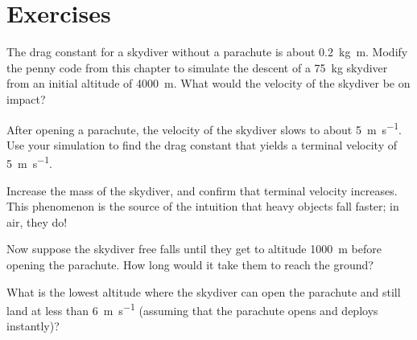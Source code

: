 \section{Exercises}


\begin{ex}


The drag constant for a skydiver without a parachute is about \SI{0.2}{\kilogram \meter}.  Modify the penny code from this chapter to simulate the descent of a \SI{75}{\kilogram} skydiver from an initial altitude of \SI{4000}{\meter}.  What would the velocity of the skydiver be on impact?

After opening a parachute, the velocity of the skydiver slows to about \SI{5}{\meter\per\second}.  Use your simulation to find the drag constant that yields a terminal velocity of \SI{5}{\meter\per\second}.

Increase the mass of the skydiver, and confirm that terminal velocity increases.  This phenomenon is the source of the intuition that heavy objects fall faster; in air, they do!

Now suppose the skydiver free falls until they get to altitude \SI{1000}{\meter} before opening the parachute.  How long would it take them to reach the ground?

What is the lowest altitude where the skydiver can open the parachute and still land at less than \SI{6}{\meter\per\second} (assuming that the parachute opens and deploys instantly)?

\end{ex}



